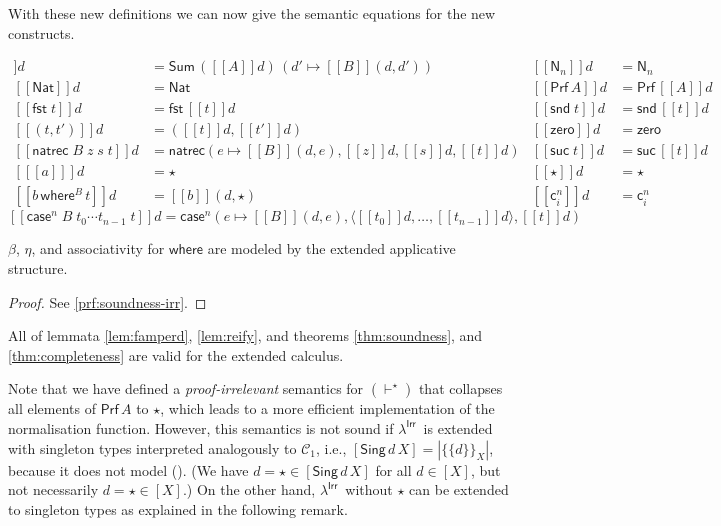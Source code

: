 \documentclass{LMCS}
\theoremstyle{plain}\newtheorem{satz}[thm]{Satz}
\newcommand{\LONGVERSION}[1]{#1}
\newcommand{\SHORTVERSION}[1]{}
\newcommand{\lambdaPI}{\texorpdfstring{\ensuremath{\lambda^{\mathsf{Irr}}}}{Proof-irrelevance}}
\newcommand{\lambdaIrr}{\lambdaPI}
\newcommand{\tfst}{\mathsf{fst}}
\newcommand{\tsnd}{\mathsf{snd}}
\newcommand{\DSum}[2]{\Sigma\,#1\,#2}
\newcommand{\depair}[2]{(#1,#2)}
\newcommand{\dfst}[1]{\mathsf{fst}\;#1}
\newcommand{\dsnd}[1]{\mathsf{snd}\;#1}
\newcommand{\natty}{\mathsf{Nat}}
\newcommand{\ztm}{\mathsf{zero}}
\newcommand{\suctm}[1]{\mathsf{suc}\;#1}
\newcommand{\natrecraw}{\mathsf{natrec}}
\newcommand{\natrec}[4]{\natrecraw\;#1\;#2\;#3\;#4}
\newcommand{\boxty}[1]{[#1]}
\newcommand{\boxtm}[1]{[#1]}
\newcommand{\vdashp}{\vdash^{\oprf}}\newcommand{\sdctx}[1]{#1\vdashp}
\newcommand{\smashed}[1]{|#1|}
\newcommand{\singD}[2]{\{\!\!\{#1\}\!\!\}_{#2}}
\newcommand{\semc}[1]{[\![#1]\!]}
\newcommand{\iPair}[2]{(#1 , #2)}
\newcommand{\iSing}[2]{\mathsf{Sing}\,#1\,{#2}}
\newcommand{\iDs}[2]{\mathsf{Sum}\,#1\,#2}
\newcommand{\fstnew}{\tfst\,}\newcommand{\sndnew}{\tsnd\,}
\newcommand{\ruleref}[1]{(\RefTirName{#1})}
\newcommand{\oprf}{\dprf}
\newcommand{\dprf}{\star}
\renewcommand{\boxty}[1]{\mathsf{Prf}\,#1}
\newcommand{\prf}[1]{\mathsf{Prf}\,#1}
\newcommand{\whereraw}{\mathsf{where}}
\newcommand{\wheretm}[3]{#1\,\whereraw\!^{#3}\,#2}
\newcommand{\elimraw}{\mathsf{case}}
\newcommand{\enum}[1]{\mathsf{N}_{#1}}
\newcommand{\elim}[4]{\elimraw\!^{#1}\;#2\;#3\;#4}
\newcommand{\const}[2]{\mathsf{c}^{#1}_{#2}}
\newcommand{\constD}[2]{\mathsf{c}^{#1}_{#2}}
\newcommand{\enumD}[1]{\mathsf{N}_{#1}}
\newcommand{\tuple}[1]{\langle #1\rangle}
\newcommand{\erecraw}{\elimraw}
\newcommand{\erec}[4]{\erecraw^{#1}(#2,#3,#4)}
\newcommand{\C}[1]{\ensuremath{\mathcal{C}_{#1}}}
\newcommand{\iZero}{\ztm}
\newcommand{\iNat}{\natty}
\newcommand{\nrecraw}{\mathsf{natrec}}
\newcommand{\drec}[4]{\nrecraw(#1,#2,#3,#4)}
\newcommand{\iSuc}[1]{\mathsf{suc}\,#1}
\newcommand{\LONGVERSION}[1]{}
\newcommand{\SHORTVERSION}[1]{#1}
\newcommand{\LONGSHORT}[2]{\LONGVERSION{#1}\SHORTVERSION{#2}}
\begin{document}
{With these new definitions we can now give the semantic equations for
the new constructs. 

\begin{defi}
  \begin{align*}
    \semc{\DSum{A}{B}}d &=  \iDs{(\semc{A}d)}{(d'\mapsto \semc{B}\iPair{d}{d'})}& 
    \semc{\enum{n}}d & = \enumD{n}\\
    \semc{\natty}d &=  \iNat& 
    \semc{\boxty{A}}d &= \prf{\semc{A}d}&\\
    \semc{\dfst{t}}d &=  \fstnew \semc{t}d& 
    \semc{\dsnd{t}}d &=  \sndnew \semc{t}d& \\
    \semc{\depair{t}{t'}}d &= \iPair{\semc{t}d}{\semc{t'}d}&
    \semc{\ztm}d &= \iZero& \\
    \semc{\natrec{B}{z}{s}{t}}d &= \drec{e\mapsto \semc{B}{\iPair{d}{e}}}{\semc{z}d}{\semc{s}d}{\semc{t}d}&
    \semc{\suctm{t}}d &=  \iSuc{\semc{t}d}& \\
    \semc{\boxtm{a}}d &= \dprf&
    \semc{\oprf}d &=  \dprf &\\
    \semc{\wheretm{b}{t}{B}}d &= \semc b {\iPair{d}{\dprf}} 
&
    \semc{\const{n}{i}}{d}& = \constD{n}{i}&
  \end{align*}
  \[
  \semc{\elim{n}{B}{t_0\cdots t_{n-1}}{t}}{d} = 
    \erec{n}{e\mapsto\semc{B}\iPair{d}{e}}{\tuple{\semc{t_0}d,\ldots,\semc{t_{n-1}}d}}{\semc{t}d}
    \]
\end{defi}


\begin{lem}
  \label{lem:soundness-irr} $\beta$, $\eta$, and
  associativity for $\whereraw$ are modeled by the extended
  applicative structure.
\end{lem}
\begin{proof}See \ref{prf:soundness-irr}.
\end{proof}
}


\begin{rem}
\LONGSHORT{
 All of lemmata \ref{lem:famperd}, \ref{lem:reify}, and theorems
  \ref{thm:soundness}, and \ref{thm:completeness} are valid for the
  extended calculus.
}{
  All of lemmata \ref{lem:famperd}, \ref{lem:reify}, and theorems
  \ref{thm:soundness}, and \ref{thm:completeness} are valid for the
  calculus with proof-irrelevance.
}
\end{rem}

Note that we have defined a \emph{proof-irrelevant}
semantics for $(\vdashp)$ that collapses
all elements of $\boxty A$ to $\dprf$, which leads to a more efficient
implementation of the normalisation function. However, this semantics
is not sound if \lambdaIrr\ is extended with singleton types
interpreted analogously to $\C{1}$, i.e., $[\iSing{d}{X}] =
\smashed{\singD{d}{X}}$, because it does not model
\ruleref{sing-eq-el}.  (We have $d = \dprf \in [\iSing{d}{X}]$ for all
$d \in [X]$, but not necessarily $d = \dprf \in [X]$.)
On the other hand, \lambdaIrr\ without $\oprf$
can be extended to singleton types as explained in the following
remark.
\end{document}
